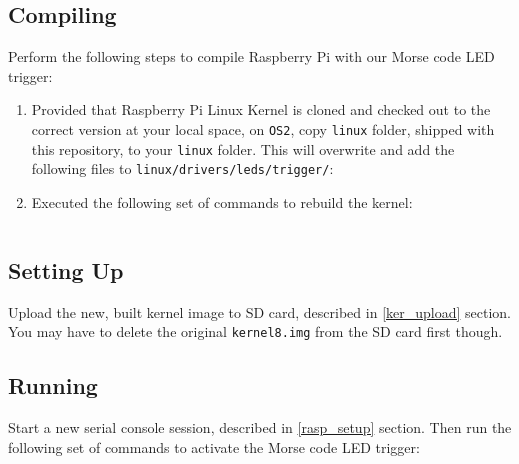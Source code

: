 \documentclass[onecolumn, oneside, letterpaper, draftclsnofoot, 10pt]{IEEEtran}
\begin{document}
\subsection{Compiling}
Perform the following steps to compile Raspberry Pi with our Morse code LED trigger:
\begin{enumerate}
\item Provided that Raspberry Pi Linux Kernel is cloned and checked out to the correct version at your local space, on \texttt{OS2}, copy \texttt{linux} folder, shipped with this repository, to your \texttt{linux} folder. This will overwrite and add the following files to \texttt{linux/drivers/leds/trigger/}:
\item Executed the following set of commands to rebuild the kernel:
\inputminted[breaklines]{bash}{cs4.sh}
\end{enumerate}

\subsection{Setting Up}
Upload the new, built kernel image to SD card, described in \ref{ker_upload} section. You may have to delete the original \texttt{kernel8.img} from the SD card first though.

\subsection{Running}
Start a new serial console session, described in \ref{rasp_setup} section. Then run the following set of commands to activate the Morse code LED trigger:
\inputminted[breaklines]{bash}{cs5.sh}


\clearpage
\medskip


\end{document}
